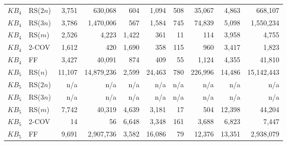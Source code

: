 \begin{tabular}{llrrrrrrrr}
$KB_4$ & RS($2n$) & 3{,}751 & 630{,}068 & 604 & 1{,}094 & 508 & 35{,}067 & 4{,}863 & 668{,}107 \\
$KB_4$ & RS($3n$) & 3{,}786 & 1{,}470{,}006 & 567 & 1{,}584 & 745 & 74{,}839 & 5{,}098 & 1{,}550{,}234 \\
$KB_4$ & RS($m$) & 2{,}526 & 4{,}223 & 1{,}422 & 361 & 11 & 114 & 3{,}958 & 4{,}755 \\
$KB_4$ & 2-COV & 1{,}612 & 420 & 1{,}690 & 358 & 115 & 960 & 3{,}417 & 1{,}823 \\
$KB_4$ & FF & 3{,}427 & 40{,}091 & 874 & 409 & 55 & 1{,}124 & 4{,}355 & 41{,}810 \\
$KB_5$ & RS($n$) & 11{,}107 & 14{,}879{,}236 & 2{,}599 & 24{,}463 & 780 & 226{,}996 & 14{,}486 & 15{,}142{,}443 \\
$KB_5$ & RS($2n$) & n/a & n/a & n/a & n/a & n/a & n/a & n/a & n/a \\
$KB_5$ & RS($3n$) & n/a & n/a & n/a & n/a & n/a & n/a & n/a & n/a \\
$KB_5$ & RS($m$) & 7{,}742 & 40{,}319 & 4{,}639 & 3{,}181 & 17 & 504 & 12{,}398 & 44{,}204 \\
$KB_5$ & 2-COV & 14 & 56 & 6{,}648 & 3{,}348 & 161 & 3{,}688 & 6{,}823 & 7{,}447 \\
$KB_5$ & FF & 9{,}691 & 2{,}907{,}736 & 3{,}582 & 16{,}086 & 79 & 12{,}376 & 13{,}351 & 2{,}938{,}079 \\
\bottomrule
\end{tabular}
